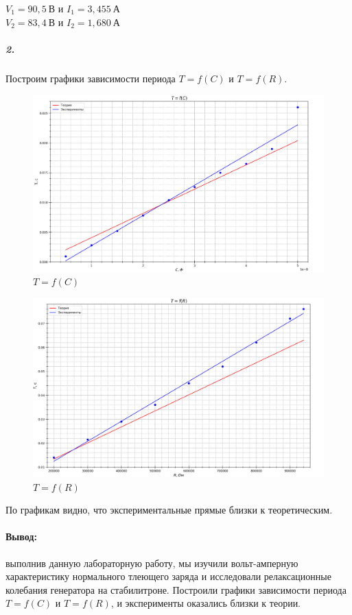 \documentclass[a4paper,12pt]{article}
\begin{document}
\begin{center}
    $V_1 = 90,5~В$ и $I_1 = 3,455~А$\\
    $V_2 = 83,4~В$ и $I_2 = 1,680~А$
\end{center}
\subparagraph{2.} Построим графики зависимости периода $T=f(C)$ и $T=f(R)$.
\begin{figure}[!h]
\centering
\includegraphics[width=0.7\linewidth]{f(C).png}
\caption{$T=f(C)$}
\label{fig:mpr}
\end{figure}
\newpage
\begin{figure}[!h]
\centering
\includegraphics[width=0.7\linewidth]{f(R).png}
\caption{$T=f(R)$}
\label{fig:mpr}
\end{figure}

По графикам видно, что экспериментальные прямые близки к теоретическим.
\paragraph{Вывод:}выполнив данную лабораторную работу, мы изучили вольт-амперную характеристику нормального тлеющего заряда и исследовали релаксационные колебания генератора на стабилитроне. Построили графики зависимости периода $T=f(C)$ и $T=f(R)$, и эксперименты оказались близки к теории.
\end{document}

